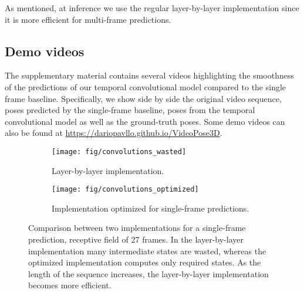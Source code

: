 \documentclass[10pt,twocolumn,letterpaper]{article}
\begin{document}
As mentioned, at inference we use the regular layer-by-layer implementation since it is more efficient for multi-frame predictions.


\subsection{Demo videos}
\label{app:demo}

The supplementary material contains several videos highlighting the smoothness of the predictions of our temporal convolutional model compared to the single frame baseline. 
Specifically, we show side by side the original video sequence, poses predicted by the single-frame baseline, poses from the temporal convolutional model as well as the ground-truth poses. Some demo videos can also be found at \url{https://dariopavllo.github.io/VideoPose3D}.

\makeatletter
\setlength{\@fptop}{0pt}
\makeatother
\begin{figure}[t!]
    \centering
        \begin{subfigure}{\linewidth}
        \centering
        \texttt{[image: fig/convolutions\_wasted]}
        \caption{Layer-by-layer implementation.}
	    \label{fig:conv_wasted}
    \end{subfigure}
    
    \vspace{3mm}
    
    \begin{subfigure}{\linewidth}
        \centering
        \texttt{[image: fig/convolutions\_optimized]}
        \caption{Implementation optimized for single-frame predictions.}
	    \label{fig:conv_optimized}
    \end{subfigure}
	\caption{Comparison between two implementations for a single-frame prediction, receptive field of 27 frames. In the layer-by-layer implementation many intermediate states are wasted, whereas the optimized implementation computes only required states. As the length of the sequence increases, the layer-by-layer implementation becomes more efficient.}
	\label{fig:optimized}
\end{figure} 
\end{document}
